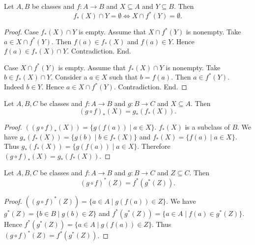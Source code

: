 \documentclass[../../set-theory/set-theory.tex]{subfiles}
\begin{document}
  \begin{forthel}
    \begin{proposition}
      Let $A, B$ be classes and $f : A \to B$ and $X \subseteq A$ and
      $Y \subseteq B$.
      Then \[ f_{*}(X) \cap Y = \emptyset \iff X \cap f^{*}(Y) = \emptyset. \]
    \end{proposition}
    \begin{proof}
      Case $f_{*}(X) \cap Y$ is empty.
        Assume that $X \cap f^{*}(Y)$ is nonempty.
        Take $a \in X \cap f^{*}(Y)$.
        Then $f(a) \in f_{*}(X)$ and $f(a) \in Y$.
        Hence $f(a) \in f_{*}(X) \cap Y$.
        Contradiction.
      End.

      Case $X \cap f^{*}(Y)$ is empty.
        Assume that $f_{*}(X) \cap Y$ is nonempty.
        Take $b \in f_{*}(X) \cap Y$.
        Consider a $a \in X$ such that $b = f(a)$.
        Then $a \in f^{*}(Y)$.
        Indeed $b \in Y$.
        Hence $a \in X \cap f^{*}(Y)$.
        Contradiction.
      End.
    \end{proof}
  \end{forthel}

  \begin{forthel}
    \begin{proposition}
      Let $A, B, C$ be classes and $f : A \to B$ and $g : B \to C$ and
      $X \subseteq A$.
      Then \[ (g \circ f)_{*}(X) = g_{*}(f_{*}(X)). \]
    \end{proposition}
    \begin{proof}
      $((g \circ f)_{*}(X)) = \{ g(f(a)) \mid a \in X \}$. %
      $f_{*}(X)$ is a subclass of $B$.
      We have $g_{*}(f_{*}(X)) = \{ g(b) \mid \text{$b \in f_{*}(X)$} \}$ and
      $f_{*}(X) = \{ f(a) \mid a \in X \}$.
      Thus $g_{*}(f_{*}(X)) = \{ g(f(a)) \mid a \in X \}$.
      Therefore $(g \circ f)_{*}(X) = g_{*}(f_{*}(X))$.
    \end{proof}
  \end{forthel}

  \begin{forthel}
    \begin{proposition}
      Let $A, B, C$ be classes and $f : A \to B$ and $g : B \to C$ and
      $Z \subseteq C$.
      Then \[ (g \circ f)^{*}(Z) = f^{*}(g^{*}(Z)). \]
    \end{proposition}
    \begin{proof}
      $((g \circ f)^{*}(Z)) = \{ a \in A \mid g(f(a)) \in Z \}$.
      We have $g^{*}(Z) = \{ b \in B \mid g(b) \in Z \}$ and
      $f^{*}(g^{*}(Z)) = \{ a \in A \mid f(a) \in g^{*}(Z) \}$.
      Hence $f^{*}(g^{*}(Z)) = \{ a \in A \mid g(f(a)) \in Z \}$.
      Thus $(g \circ f)^{*}(Z) = f^{*}(g^{*}(Z))$.
    \end{proof}
  \end{forthel}
\end{document}
